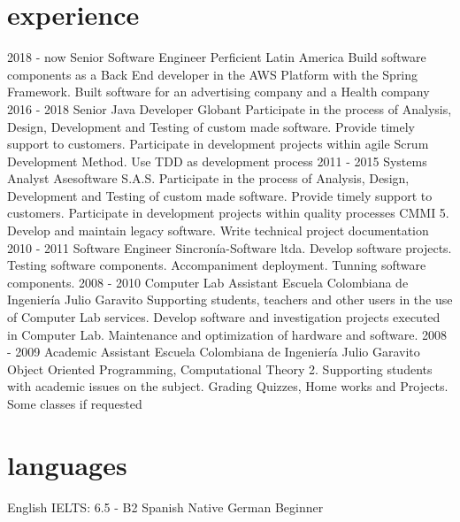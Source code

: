 \documentclass[]{twentysecondcv}
\begin{document}
\section{experience}
\begin{twenty}
\twentyitem
    {2018 - now}
    {Senior Software Engineer}
    {Perficient Latin America}
    {Build software components as a Back End developer in the AWS Platform with the Spring Framework. Built software for an advertising company and a Health company}
\twentyitem
    {2016 - 2018}
    {Senior Java Developer}
    {Globant}
    {Participate in the process of Analysis, Design, Development and Testing of custom made software. Provide timely support to customers. Participate in development projects within agile Scrum Development Method. Use TDD as development process}
  \twentyitem
    {2011 - 2015}
    {Systems Analyst}
    {Asesoftware S.A.S.}
    {Participate in the process of Analysis, Design, Development and Testing of custom made software. Provide timely support to customers. Participate in development projects within quality processes CMMI 5. Develop and maintain legacy software. Write technical project documentation}
  \twentyitem
    {2010 - 2011}
    {Software Engineer}
    {Sincron\'ia-Software ltda.}
    {Develop software projects. Testing software components. Accompaniment deployment. Tunning software components.}
\twentyitem
    {2008 - 2010}
    {Computer Lab Assistant}
    {Escuela Colombiana de Ingenier\'ia  Julio Garavito}
    {Supporting students, teachers and other users in the use of Computer Lab services. Develop software and investigation projects executed in Computer Lab. Maintenance and optimization of hardware and software.}
\twentyitem
    {2008 - 2009}
    {Academic Assistant}
    {Escuela Colombiana de Ingenier\'ia  Julio Garavito}
    {Object Oriented Programming, Computational Theory 2. Supporting students with academic issues on the subject. Grading Quizzes, Home works and Projects. Some classes if requested}

\end{twenty}

\section{languages}

\begin{twenty}
 \twentyitem
    {English}
    {IELTS: 6.5 - B2}
  \twentyitem
    {Spanish}
    {Native}
  \twentyitem
    {German}
    {Beginner}
\end{twenty}


\end{document}
